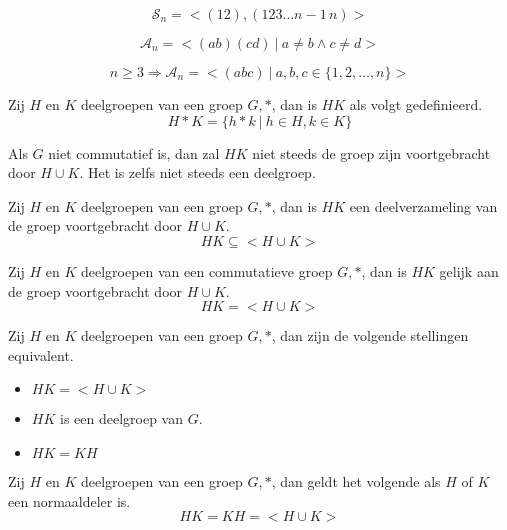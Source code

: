 \documentclass[main.tex]{subfiles}
\begin{document}
\begin{pr}
\[ \mathcal{S}_n = <(12), (123\dotsc n-1\,n)> \]
\end{pr}

\begin{pr}
\[ \mathcal{A}_n = <(ab)(cd)\ |\ a\neq b \wedge c \neq d> \]
\end{pr}

\begin{pr}
\[ n \ge 3 \Rightarrow \mathcal{A}_n = <(abc)\ |\ a,b,c \in \{1,2,\dotsc,n\}> \]
\end{pr}

\begin{de}
Zij $H$ en $K$ deelgroepen van een groep $G,*$, dan is $HK$ als volgt gedefinieerd.
\[ H*K = \{ h*k\ |\ h\in H, k\in K \} \]
\end{de}

\begin{opm}
Als $G$ niet commutatief is, dan zal $HK$ niet steeds de groep zijn voortgebracht door $H\cup K$.
Het is zelfs niet steeds een deelgroep.
\end{opm}

\begin{st}
Zij $H$ en $K$ deelgroepen van een groep $G,*$, dan is $HK$ een deelverzameling van de groep voortgebracht door $H\cup K$.
\[ HK \subseteq <H\cup K> \]
\end{st}

\begin{st}
Zij $H$ en $K$ deelgroepen van een commutatieve groep $G,*$, dan is $HK$ gelijk aan de groep voortgebracht door $H\cup K$.
\[ HK = <H\cup K> \]
\end{st}

\begin{pr}
Zij $H$ en $K$ deelgroepen van een groep $G,*$, dan zijn de volgende stellingen equivalent.
\begin{itemize}
\item $HK = <H\cup K>$
\item $HK$ is een deelgroep van $G$.
\item $HK = KH$
\end{itemize}
\end{pr}

\begin{gev}
Zij $H$ en $K$ deelgroepen van een groep $G,*$, dan geldt het volgende als $H$ of $K$ een normaaldeler is.
\[ HK = KH = <H\cup K> \]
\end{gev}
\end{document}
